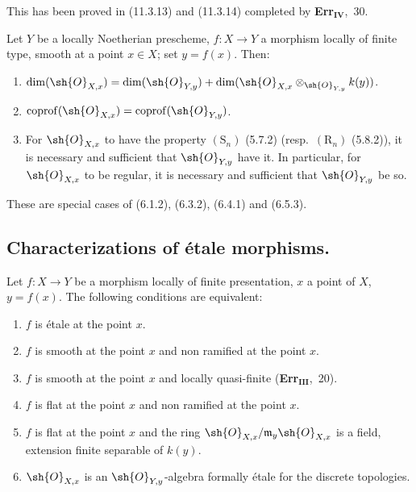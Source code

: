 This has been proved in (11.3.13) and (11.3.14) completed by \textbf{Err}$_\textbf{IV}$,~30.

\begin{proposition}[17.5.8]
\label{IV.17.5.8}
Let $Y$ be a locally Noetherian prescheme, $f:X\to Y$ a morphism locally of finite type, smooth at a point $x\in X$; set $y=f(x)$.
Then:
\begin{enumerate}[label=(\roman*)]
  \item $\dim(\sh{O}_{X,x})=\dim(\sh{O}_{Y,y})+\dim(\sh{O}_{X,x}\otimes_{\sh{O}_{Y,y}}k(y))$.
  \item $\operatorname{coprof}(\sh{O}_{X,x})=\operatorname{coprof}(\sh{O}_{Y,y})$.
  \item For $\sh{O}_{X,x}$ to have the property $(\mathrm{S}_n)$ (5.7.2) (resp.\ $(\mathrm{R}_n)$ (5.8.2)), it is necessary and sufficient that $\sh{O}_{Y,y}$ have it.
  In particular, for $\sh{O}_{X,x}$ to be regular, it is necessary and sufficient that $\sh{O}_{Y,y}$ be so.
\end{enumerate}
\end{proposition}

These are special cases of (6.1.2), (6.3.2), (6.4.1) and (6.5.3).


\subsection{Characterizations of \'etale morphisms.}
\label{subsection:IV.17.6}


\begin{theorem}[17.6.1]
\label{IV.17.6.1}
Let $f:X\to Y$ be a morphism locally of finite presentation, $x$ a point of $X$, $y=f(x)$.
The following conditions are equivalent:
\begin{enumerate}[label=(\alph*)]
  \item[a)] $f$ is \'etale at the point $x$.
  \item[a')] $f$ is smooth at the point $x$ and non ramified at the point $x$.
  \item[b)] $f$ is smooth at the point $x$ and locally quasi-finite (\textbf{Err}$_\textbf{III}$,~20).
  \item[c)] $f$ is flat at the point $x$ and non ramified at the point $x$.
  \item[c')] $f$ is flat at the point $x$ and the ring $\sh{O}_{X,x}/\mathfrak{m}_y\sh{O}_{X,x}$ is a field, extension finite separable of $k(y)$.
  \item[d)] $\sh{O}_{X,x}$ is an $\sh{O}_{Y,y}$-algebra formally \'etale for the discrete topologies.
\end{enumerate}
\end{theorem}


